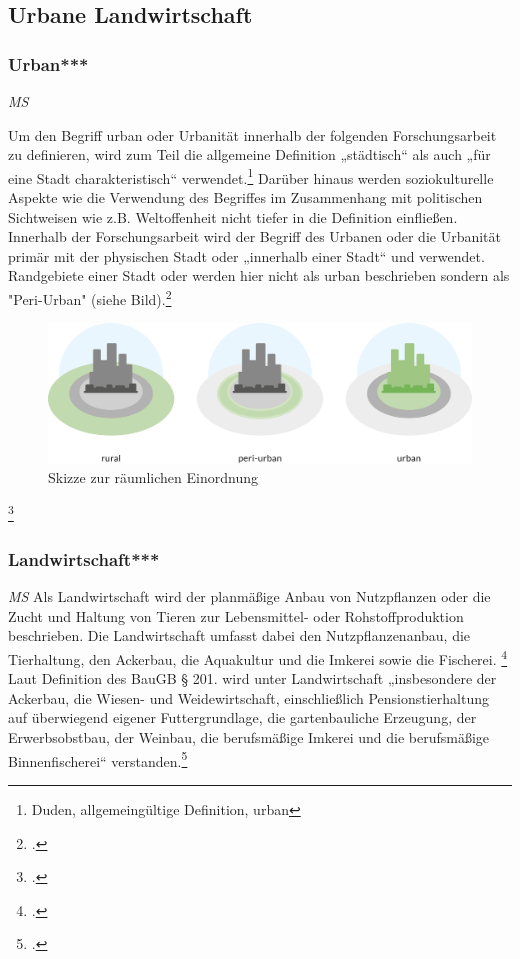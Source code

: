 \documentclass{scrartcl}
\begin{document}
\subsection{Urbane Landwirtschaft}

\subsubsection{Urban***}
\begin{flushright}
\textit{MS}
\end{flushright}
Um den Begriff urban oder Urbanität innerhalb der folgenden Forschungsarbeit zu definieren, wird zum Teil die allgemeine Definition „städtisch“ als auch „für eine Stadt charakteristisch“ verwendet.\footnote{Duden, allgemeingültige Definition, urban} Darüber hinaus werden soziokulturelle Aspekte wie die Verwendung des Begriffes im Zusammenhang mit politischen Sichtweisen wie z.B. Weltoffenheit nicht tiefer in die Definition einfließen. Innerhalb der Forschungsarbeit wird der Begriff des Urbanen oder die Urbanität primär mit der physischen Stadt oder „innerhalb einer Stadt“ und verwendet. Randgebiete einer Stadt oder werden hier nicht als urban beschrieben sondern als "Peri-Urban" (siehe Bild).\footcite[S. 140]{MullerUrbanStadt}

\begin{figure}[htbp]
\centering
\includegraphics[width=12cm]{image_folder/SchaubildUrbaneEingrenzungen.png}
\caption{Skizze zur räumlichen Einordnung}
\end{figure}
\footcite[]{Eigene Zeichnung, entstanden aus dem Vorbild von Carlos Tobisch, Oasen im Beton S.26, Abb.7}

\subsubsection{Landwirtschaft***}\textit{MS}
Als Landwirtschaft wird der planmäßige Anbau von Nutzpflanzen oder die Zucht und Haltung von Tieren zur Lebensmittel- oder Rohstoffproduktion beschrieben. Die Landwirtschaft umfasst dabei den Nutzpflanzenanbau, die Tierhaltung, den Ackerbau, die Aquakultur und die Imkerei sowie die Fischerei. \footcite[S. 5]{Lohrberg2001StadtnaheFreiraumplanung}  Laut Definition des BauGB § 201. wird unter Landwirtschaft „insbesondere der Ackerbau, die Wiesen- und Weidewirtschaft, einschließlich Pensionstierhaltung auf überwiegend eigener Futtergrundlage, die gartenbauliche Erzeugung, der Erwerbsobstbau, der Weinbau, die berufsmäßige Imkerei und die berufsmäßige Binnenfischerei“ verstanden.\footcite[§ 201]{}
\end{document}
